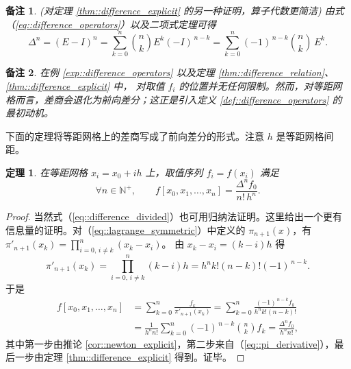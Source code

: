 \documentclass[a4paper]{ctexart}
\newtheorem{theorem}{定理}
\newtheorem{remark}{备注}
\numberwithin{theorem}{section}
\numberwithin{equation}{section}
\numberwithin{figure}{section}
\numberwithin{remark}{section}
\begin{document}
\begin{remark}
    (对定理 \ref{thm::difference_explicit} 的另一种证明，算子代数更简洁)
由式（\ref{eq::difference_operators}）以及二项式定理可得
\begin{equation*}
\Delta^{n}=(E-I)^{n}=\sum_{k=0}^{n}\binom{n}{k}E^{k}(-I)^{\,n-k}
=\sum_{k=0}^{n}(-1)^{\,n-k}\binom{n}{k}\,E^{k}.
\end{equation*}
\end{remark}

\begin{remark}
在例 \ref{exp::difference_operators} 以及定理 \ref{thm::difference_relation}、\ref{thm::difference_explicit} 中，
对取值 $f_i$ 的位置并无任何限制。然而，对等距网格而言，差商会退化为前向差分；这正是引入定义 \ref{def::difference_operators} 的最初动机。
\end{remark}

下面的定理将等距网格上的差商写成了前向差分的形式。注意 $h$ 是等距网格间距。

\begin{theorem}
    \label{thm::difference_divided}
在等距网格 $x_i=x_0+ih$ 上，取值序列 $f_i=f(x_i)$ 满足
\begin{equation}
    \label{eq::difference_divided}
\forall n\in\mathbb{N}^+,\qquad
f[x_0,x_1,\ldots,x_n]=\frac{\Delta^{n}f_0}{n!\,h^{n}}.
\end{equation}
\end{theorem}
\begin{proof}
当然式（\ref{eq::difference_divided}）也可用归纳法证明。这里给出一个更有信息量的证明。对（\ref{eq::lagrange_symmetric}）中定义的
$\pi_{n+1}(x)$，有
$\pi'_{n+1}(x_k)=\prod_{i=0,\, i\ne k}^{n}(x_k-x_i)$。
由 $x_k-x_i=(k-i)h$ 得
\begin{equation}
    \label{eq::pi_derivative}
\pi'_{n+1}(x_k)=\prod_{i=0,\,i\ne k}^{n}(k-i)h
=h^{n}k!(n-k)!(-1)^{\,n-k}.
\end{equation}
于是
\begin{align*}
f[x_0,x_1,\ldots,x_n]
&=\sum_{k=0}^{n}\frac{f_k}{\pi'_{n+1}(x_k)}
=\sum_{k=0}^{n}\frac{(-1)^{\,n-k}f_k}{h^{n}k!(n-k)!}\\
&=\frac{1}{h^{n}n!}\sum_{k=0}^{n}(-1)^{\,n-k}\binom{n}{k}f_k
=\frac{\Delta^{n}f_0}{h^{n}n!},
\end{align*}
其中第一步由推论 \ref{cor::newton_explicit}，第二步来自（\ref{eq::pi_derivative}），最后一步由定理 \ref{thm::difference_explicit} 得到。证毕。
\end{proof}
\end{document}
